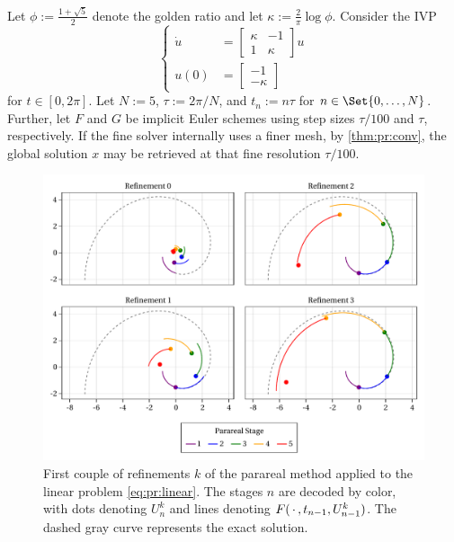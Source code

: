 \begin{example}
\label{example:parareal}
  Let $\phi := \frac{1+\sqrt{5}}{2}$ denote the golden ratio and
  let $\kappa := \frac{2}{\pi} \log \phi$.
  Consider the \ac{IVP}
  \begin{equation}
    \label{eq:pr:linear}
    \left\{
    \begin{aligned}
      \dot u &= \begin{bmatrix}
        \kappa & -1 \\
        1 & \kappa
      \end{bmatrix} u \\
      u(0) &= \begin{bmatrix}
        -1 \\ -\kappa
      \end{bmatrix}
    \end{aligned}
    \right.
  \end{equation}
  for $t\in[0,2\pi]$.
  Let $N := 5$, $\tau := 2\pi/N$, and $t_n := n\tau$ for $n\in\Set{0,\ldots,N}$.
  Further, let $F$ and $G$ be implicit Euler schemes using step sizes $\tau/100$ and $\tau$, respectively.
  If the fine solver internally uses a finer mesh,
  by \autoref{thm:pr:conv},
  the global solution $x$ may be retrieved at that fine resolution $\tau/100$.

  \begin{figure}[tb]
    \includegraphics[width=\textwidth]{figures/fig_parareal_example.pdf}
    \caption[Parareal method applied to a linear ODE]{%
      First couple of refinements $k$ of the
      parareal method applied to the linear problem \eqref{eq:pr:linear}.
      The stages $n$ are decoded by color,
      with dots denoting $U^k_n$ and lines denoting $F(\optional{}, t_{n-1}, U^k_{n-1})$.
      The dashed gray curve represents the exact solution.
    }
    \label{fig:pr:linear}
  \end{figure}


\end{example}
